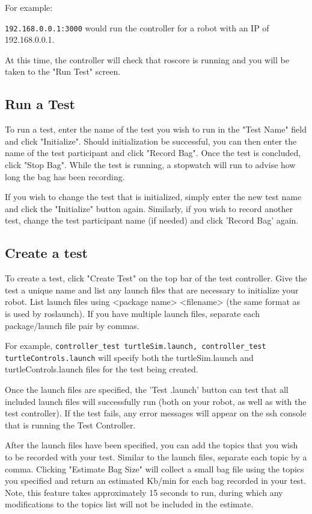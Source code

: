 \documentclass[onecolumn, draftclsnofoot,10pt, compsoc]{report}
\begin{document}
For example:

\texttt{192.168.0.0.1:3000} would run the controller for a robot with an IP of 192.168.0.0.1.

At this time, the controller will check that roscore is running and you will be taken to the "Run Test" screen.
\subsection{Run a Test}

To run a test, enter the name of the test you wish to run in the "Test Name" field and click "Initialize". Should initialization be successful, you can then enter the name of the test participant and click "Record Bag". Once the test is concluded, click "Stop Bag". While the test is running, a stopwatch will run to advise how long the bag has been recording.

If you wish to change the test that is initialized, simply enter the new test name and click the "Initialize" button again. Similarly, if you wish to record another test, change the test participant name (if needed) and click 'Record Bag' again.

\subsection{Create a test}
To create a test, click "Create Test" on the top bar of the test controller. Give the test a unique name and list any launch files that are necessary to initialize your robot. List launch files using <package name> <filename> (the same format as is used by roslaunch). If you have multiple launch files, separate each package/launch file pair by commas. 

For example, \texttt{controller\_test turtleSim.launch, controller\_test turtleControls.launch} will specify both the turtleSim.launch and turtleControls.launch files for the test being created.

Once the launch files are specified, the 'Test .launch' button can test that all included launch files will successfully run (both on your robot, as well as with the test controller). If the test fails, any error messages will appear on the ssh console that is running the Test Controller. 

After the launch files have been specified, you can add the topics that you wish to be recorded with your test. Similar to the launch files, separate each topic by a comma. Clicking "Estimate Bag Size" will collect a small bag file using the topics you specified and return an estimated Kb/min for each bag recorded in your test. Note, this feature takes approximately 15 seconds to run, during which any modifications to the topics list will not be included in the estimate. 
\end{document}
